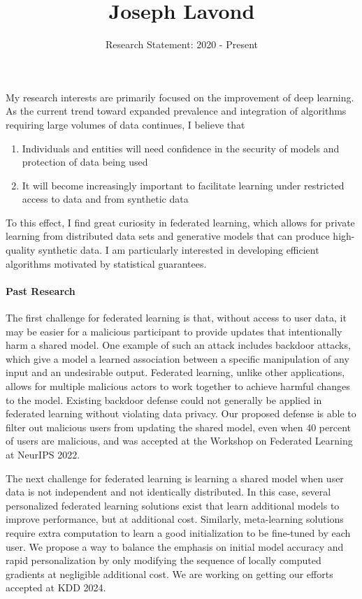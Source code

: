 \documentclass[10pt]{article}
\title{\vspace{-1in}Joseph Lavond}
\author{Research Statement: 2020 - Present}
\date{}
\begin{document}
    \maketitle

    \paragraph{}
    My research interests are primarily focused on the improvement of deep learning.
    As the current trend toward expanded prevalence and integration of algorithms requiring large volumes of data continues, I believe that
    \begin{enumerate}
        \item Individuals and entities will need confidence in the security of models and protection of data being used
        \item It will become increasingly important to facilitate learning under restricted access to data and from synthetic data
    \end{enumerate}
    To this effect, I find great curiosity in federated learning, which allows for private learning from distributed data sets and generative models that can produce high-quality synthetic data.
    I am particularly interested in developing efficient algorithms motivated by statistical guarantees. 

    \paragraph{Past Research}
    The first challenge for federated learning is that, without access to user data, it may be easier for a malicious participant to provide updates that intentionally harm a shared model.
    One example of such an attack includes backdoor attacks, which give a model a learned association between a specific manipulation of any input and an undesirable output. 
    Federated learning, unlike other applications, allows for multiple malicious actors to work together to achieve harmful changes to the model.
    Existing backdoor defense could not generally be applied in federated learning without violating data privacy.
    Our proposed defense is able to filter out malicious users from updating the shared model, even when 40 percent of users are malicious, and was accepted at the Workshop on Federated Learning at NeurIPS 2022.

    The next challenge for federated learning is learning a shared model when user data is not independent and not identically distributed.
    In this case, several personalized federated learning solutions exist that learn additional models to improve performance, but at additional cost. 
    Similarly, meta-learning solutions require extra computation to learn a good initialization to be fine-tuned by each user.
    We propose a way to balance the emphasis on initial model accuracy and rapid personalization by only modifying the sequence of locally computed gradients at negligible additional cost.
    We are working on getting our efforts accepted at KDD 2024. 
\end{document}
